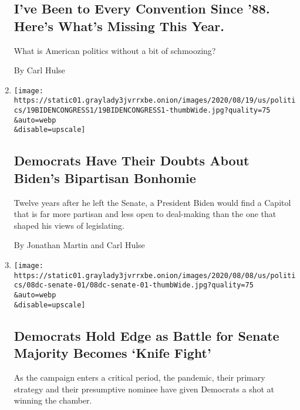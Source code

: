 \begin{enumerate}
  \hypertarget{ive-been-to-every-convention-since-88-heres-whats-missing-this-year}{%
  \subsection{I've Been to Every Convention Since '88. Here's What's
  Missing This
  Year.}\label{ive-been-to-every-convention-since-88-heres-whats-missing-this-year}}

  What is American politics without a bit of schmoozing?

  By Carl Hulse
\item
  \href{/2020/08/20/us/politics/biden-congress.html}{}

  \texttt{[image: https://static01.graylady3jvrrxbe.onion/images/2020/08/19/us/politics/19BIDENCONGRESS1/19BIDENCONGRESS1-thumbWide.jpg?quality=75\\\&auto=webp\\\&disable=upscale]}

  \hypertarget{democrats-have-their-doubts-about-bidens-bipartisan-bonhomie}{%
  \subsection{Democrats Have Their Doubts About Biden's Bipartisan
  Bonhomie}\label{democrats-have-their-doubts-about-bidens-bipartisan-bonhomie}}

  Twelve years after he left the Senate, a President Biden would find a
  Capitol that is far more partisan and less open to deal-making than
  the one that shaped his views of legislating.

  By Jonathan Martin and Carl Hulse
\item
  \href{/2020/08/09/us/democrats-senate-majority-election.html}{}

  \texttt{[image: https://static01.graylady3jvrrxbe.onion/images/2020/08/08/us/politics/08dc-senate-01/08dc-senate-01-thumbWide.jpg?quality=75\\\&auto=webp\\\&disable=upscale]}

  \hypertarget{democrats-hold-edge-as-battle-for-senate-majority-becomes-knife-fight}{%
  \subsection{Democrats Hold Edge as Battle for Senate Majority Becomes
  `Knife
  Fight'}\label{democrats-hold-edge-as-battle-for-senate-majority-becomes-knife-fight}}

  As the campaign enters a critical period, the pandemic, their primary
  strategy and their presumptive nominee have given Democrats a shot at
  winning the chamber.


\end{enumerate}

